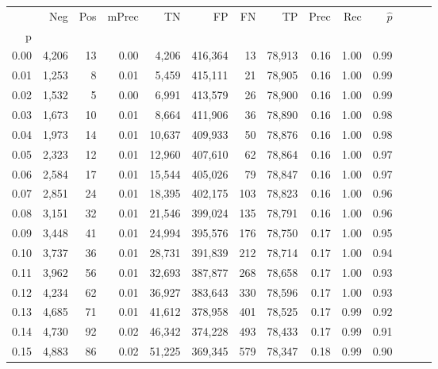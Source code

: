 \begin{tabular}{rrrrrrrrrrrrrr}
\toprule
{} &    Neg &    Pos & mPrec &       TN &       FP &      FN &      TP &  Prec &   Rec & $\hat{p}$ \\
p    &        &        &       &          &          &         &         &       &       &           \\
\midrule
0.00 &  4,206 &     13 &  0.00 &    4,206 &  416,364 &      13 &  78,913 &  0.16 &  1.00 &      0.99 \\
0.01 &  1,253 &      8 &  0.01 &    5,459 &  415,111 &      21 &  78,905 &  0.16 &  1.00 &      0.99 \\
0.02 &  1,532 &      5 &  0.00 &    6,991 &  413,579 &      26 &  78,900 &  0.16 &  1.00 &      0.99 \\
0.03 &  1,673 &     10 &  0.01 &    8,664 &  411,906 &      36 &  78,890 &  0.16 &  1.00 &      0.98 \\
0.04 &  1,973 &     14 &  0.01 &   10,637 &  409,933 &      50 &  78,876 &  0.16 &  1.00 &      0.98 \\
0.05 &  2,323 &     12 &  0.01 &   12,960 &  407,610 &      62 &  78,864 &  0.16 &  1.00 &      0.97 \\
0.06 &  2,584 &     17 &  0.01 &   15,544 &  405,026 &      79 &  78,847 &  0.16 &  1.00 &      0.97 \\
0.07 &  2,851 &     24 &  0.01 &   18,395 &  402,175 &     103 &  78,823 &  0.16 &  1.00 &      0.96 \\
0.08 &  3,151 &     32 &  0.01 &   21,546 &  399,024 &     135 &  78,791 &  0.16 &  1.00 &      0.96 \\
0.09 &  3,448 &     41 &  0.01 &   24,994 &  395,576 &     176 &  78,750 &  0.17 &  1.00 &      0.95 \\
0.10 &  3,737 &     36 &  0.01 &   28,731 &  391,839 &     212 &  78,714 &  0.17 &  1.00 &      0.94 \\
0.11 &  3,962 &     56 &  0.01 &   32,693 &  387,877 &     268 &  78,658 &  0.17 &  1.00 &      0.93 \\
0.12 &  4,234 &     62 &  0.01 &   36,927 &  383,643 &     330 &  78,596 &  0.17 &  1.00 &      0.93 \\
0.13 &  4,685 &     71 &  0.01 &   41,612 &  378,958 &     401 &  78,525 &  0.17 &  0.99 &      0.92 \\
0.14 &  4,730 &     92 &  0.02 &   46,342 &  374,228 &     493 &  78,433 &  0.17 &  0.99 &      0.91 \\
0.15 &  4,883 &     86 &  0.02 &   51,225 &  369,345 &     579 &  78,347 &  0.18 &  0.99 &      0.90 \\

\end{tabular}
